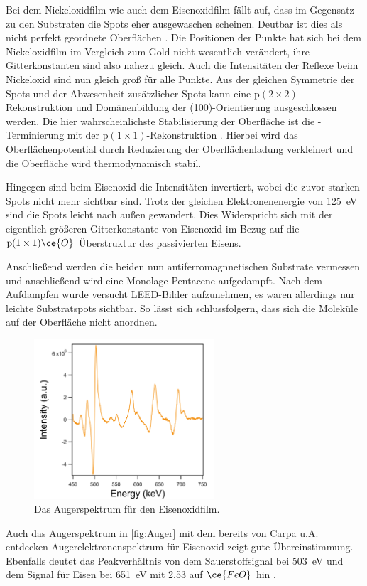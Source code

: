         Bei dem Nickeloxidfilm wie auch dem Eisenoxidfilm fällt auf, dass im Gegensatz zu den Substraten die Spots eher ausgewaschen scheinen.
        Deutbar ist dies als nicht perfekt geordnete Oberflächen \cite{NiO_34}.
        Die Positionen der Punkte hat sich bei dem Nickeloxidfilm im Vergleich zum Gold nicht wesentlich verändert, ihre Gitterkonstanten sind also nahezu gleich.
        Auch die Intensitäten der Reflexe beim Nickeloxid sind nun gleich groß für alle Punkte.
        Aus der gleichen Symmetrie der Spots und der Abwesenheit zusätzlicher Spots kann eine $\text{p}(2 \times 2)$ Rekonstruktion \cite{NiO_37} und Domänenbildung der (100)-Orientierung \cite{NiO_36} ausgeschlossen werden.
        Die hier wahrscheinlichste Stabilisierung der Oberfläche ist die -Terminierung mit der $\text{p}(1 \times 1)$-Rekonstruktion \cite{NiO_35}.
        Hierbei wird das Oberflächenpotential durch Reduzierung der Oberflächenladung verkleinert und die Oberfläche wird thermodynamisch stabil.

        Hingegen sind beim Eisenoxid die Intensitäten invertiert, wobei die zuvor starken Spots nicht mehr sichtbar sind.
        Trotz der gleichen Elektronenenergie von \SI{125}{\electronvolt} sind die Spots leicht nach außen gewandert.
        Dies Widerspricht sich mit der eigentlich größeren Gitterkonstante von Eisenoxid im Bezug auf die $\text{p}(1 \times 1)\ce{O}$ Überstruktur des passivierten Eisens.

        Anschließend werden die beiden nun antiferromagnnetischen Substrate vermessen und anschließend wird eine Monolage Pentacene aufgedampft.
        Nach dem Aufdampfen wurde versucht LEED-Bilder aufzunehmen, es waren allerdings nur leichte Substratspots sichtbar.
        So lässt sich schlussfolgern, dass sich die Moleküle auf der Oberfläche nicht anordnen.

        \begin{figure}
            \centering
            \includegraphics[width=0.6\textwidth]{./content/pictures/FeO/2021_09_09_001_AES_FeO.png}
            \caption{Das Augerspektrum für den Eisenoxidfilm.}
            \label{fig:Auger}
        \end{figure}
        Auch das Augerspektrum in \autoref{fig:Auger} mit dem bereits von Carpa u.A. \cite{FeO_1} entdecken Augerelektronenspektrum für Eisenoxid zeigt gute Übereinstimmung.
        Ebenfalls deutet das Peakverhältnis von dem Sauerstoffsignal bei \SI{503}{\electronvolt} und dem Signal für Eisen bei \SI{651}{\electronvolt} mit \num{2.53} auf $\ce{FeO}$ hin \cite{FeO_1, Auger}.
        

